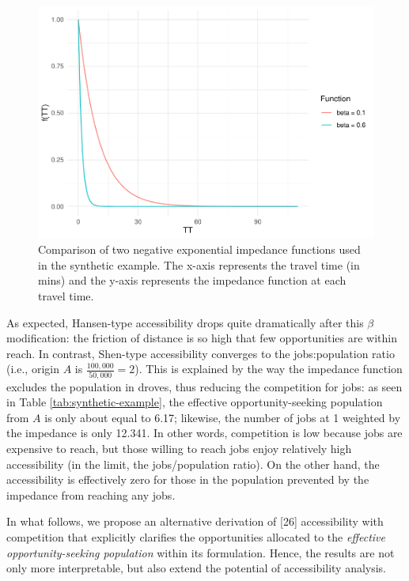 \documentclass[10pt,letterpaper]{article}
\begin{document}
\begin{figure}
\includegraphics[width=1\linewidth]{Spatial-Availability-Refreshed_files/figure-latex/comparison-impedance-functions-synthetic-example-1} \caption{\label{fig:impedance-functions-comparison}Comparison of two negative exponential impedance functions used in the synthetic example. The x-axis represents the travel time (in mins) and the y-axis represents the impedance function at each travel time.}\label{fig:comparison-impedance-functions-synthetic-example}
\end{figure}

As expected, Hansen-type accessibility drops quite dramatically after
this \(\beta\) modification: the friction of distance is so high that
few opportunities are within reach. In contrast, Shen-type accessibility
converges to the jobs:population ratio (i.e., origin \(A\) is
\(\frac{100,000}{50,000} = 2\)). This is explained by the way the
impedance function excludes the population in droves, thus reducing the
competition for jobs: as seen in Table \ref{tab:synthetic-example}, the
effective opportunity-seeking population from \(A\) is only about equal
to 6.17; likewise, the number of jobs at 1 weighted by the impedance is
only 12.341. In other words, competition is low because jobs are
expensive to reach, but those willing to reach jobs enjoy relatively
high accessibility (in the limit, the jobs/population ratio). On the
other hand, the accessibility is effectively zero for those in the
population prevented by the impedance from reaching any jobs.

In what follows, we propose an alternative derivation of {[}26{]}
accessibility with competition that explicitly clarifies the
opportunities allocated to the \emph{effective opportunity-seeking
population} within its formulation. Hence, the results are not only more
interpretable, but also extend the potential of accessibility analysis.
\end{document}
